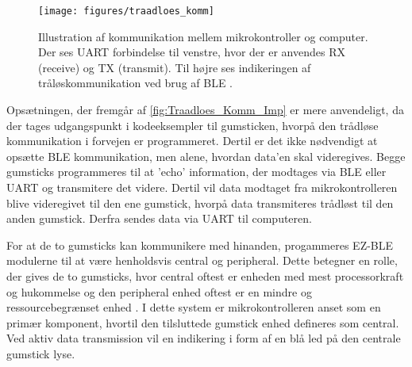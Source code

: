 \begin{figure}[H]
	\centering
	\texttt{[image: figures/traadloes\_komm]}
	\caption{Illustration af kommunikation mellem mikrokontroller og computer. Der ses UART forbindelse til venstre, hvor der er anvendes RX (receive) og TX (transmit). Til højre ses indikeringen af tråløskommunikation ved brug af BLE \citep{cypresspsoc2015, cypresspsoc42015}.} 
	\label{fig:Traadloes_Komm_Imp}
\end{figure}

\noindent
Opsætningen, der fremgår af \autoref{fig:Traadloes_Komm_Imp} er mere anvendeligt, da der tages udgangspunkt i kodeeksempler til gumsticken, hvorpå den trådløse kommunikation i forvejen er programmeret. Dertil er det ikke nødvendigt at opsætte BLE kommunikation, men alene, hvordan data'en skal videregives. 
Begge gumsticks programmeres til at 'echo' information, der modtages via BLE eller UART og transmitere det videre. Dertil vil data modtaget fra mikrokontrolleren blive videregivet til den ene gumstick, hvorpå data transmiteres trådløst til den anden gumstick. Derfra sendes data via UART til computeren. 

For at de to gumsticks kan kommunikere med hinanden, progammeres EZ-BLE modulerne til at være henholdsvis central og peripheral. Dette betegner en rolle, der gives de to gumsticks, hvor central oftest er enheden med mest processorkraft og hukommelse og den peripheral enhed oftest er en mindre og ressourcebegrænset enhed \citep{townsend2014}. I dette system er mikrokontrolleren anset som en primær komponent, hvortil den tilsluttede gumstick enhed defineres som central. Ved aktiv data transmission vil en indikering i form af en blå led på den centrale gumstick lyse.